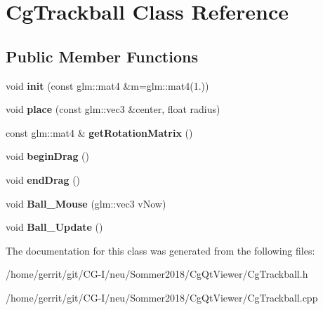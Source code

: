 \hypertarget{class_cg_trackball}{}\section{Cg\+Trackball Class Reference}
\label{class_cg_trackball}
\subsection*{Public Member Functions}
\begin{DoxyCompactItemize}
\item 
\mbox{\label{class_cg_trackball_a7dc8602f6b16d3bca3cb661e849c62c7}} 
void {\bfseries init} (const glm\+::mat4 \&m=glm\+::mat4(1.))
\item 
\mbox{\label{class_cg_trackball_a6061f4e809b8e97cb8547d5cdedb0ea8}} 
void {\bfseries place} (const glm\+::vec3 \&center, float radius)
\item 
\mbox{\label{class_cg_trackball_acbb762588c14924ca62091b5e4d97331}} 
const glm\+::mat4 \& {\bfseries get\+Rotation\+Matrix} ()
\item 
\mbox{\label{class_cg_trackball_a02e5937df9c8ead0073ae908534cc8be}} 
void {\bfseries begin\+Drag} ()
\item 
\mbox{\label{class_cg_trackball_a9dc1c37950ba74e1049335998eb94d6b}} 
void {\bfseries end\+Drag} ()
\item 
\mbox{\label{class_cg_trackball_a18c3c758e492c86ed7917d263521fc8f}} 
void {\bfseries Ball\+\_\+\+Mouse} (glm\+::vec3 v\+Now)
\item 
\mbox{\label{class_cg_trackball_a0586c533be16a85a88315ae5124a55fb}} 
void {\bfseries Ball\+\_\+\+Update} ()
\end{DoxyCompactItemize}


The documentation for this class was generated from the following files\+:\begin{DoxyCompactItemize}
\item 
/home/gerrit/git/\+C\+G-\/\+I/neu/\+Sommer2018/\+Cg\+Qt\+Viewer/Cg\+Trackball.\+h\item 
/home/gerrit/git/\+C\+G-\/\+I/neu/\+Sommer2018/\+Cg\+Qt\+Viewer/Cg\+Trackball.\+cpp\end{DoxyCompactItemize}
